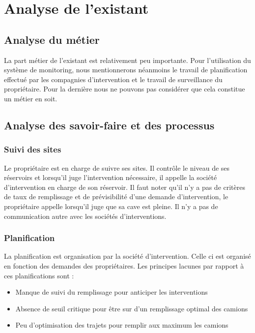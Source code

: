 \section{Analyse de l'existant}

\subsection{Analyse du métier}

La part métier de l'existant est relativement peu importante. Pour l'utilisation du système de monitoring, nous mentionnerons néanmoins le travail de planification effectué par les compagnies d'intervention et le travail de surveillance du propriétaire. Pour la dernière nous ne pouvons pas considérer que cela constitue un métier en soit.

\subsection{Analyse des savoir-faire et des processus}

\subsubsection{Suivi des sites}

Le propriétaire est en charge de suivre ses sites. Il contrôle le niveau de ses réservoirs et lorsqu'il juge l'intervention nécessaire, il appelle la société d'intervention en charge de son réservoir. Il faut noter qu'il n'y a pas de critères de taux de remplissage et de prévisibilité d'une demande d'intervention, le propriétaire appelle lorsqu'il juge que sa cave est pleine.
Il n'y a pas de communication autre avec les sociétés d'interventions.


\subsubsection{Planification}

La planification est organisation par la société d'intervention. Celle ci est organisé en fonction des demandes des propriétaires. Les principes lacunes par rapport à ces planifications sont : 
\begin{itemize}
\item Manque de suivi du remplissage pour anticiper les interventions
\item Absence de seuil critique pour être sur d'un remplissage optimal des camions
\item Peu d'optimisation des trajets pour remplir aux maximum les camions
\end{itemize}

